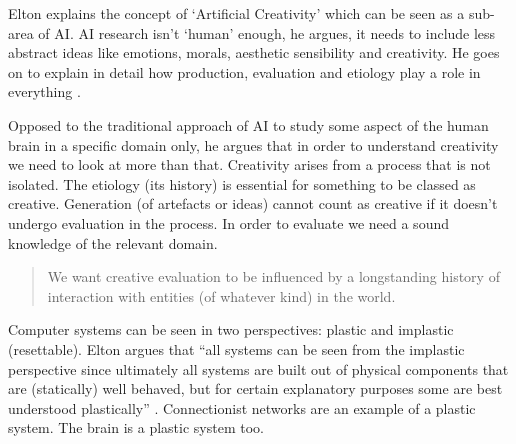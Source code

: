 \spirals

Elton explains the concept of `Artificial Creativity' which can be seen as a sub-area of \ac{AI}. \ac{AI} research isn't `human' enough, he argues, it needs to include less abstract ideas like emotions, morals, aesthetic sensibility and creativity. He goes on to explain in detail how production, evaluation and etiology play a role in everything \autocite{Elton1995}.

Opposed to the traditional approach of \ac{AI} to study some aspect of the human brain in a specific domain only, he argues that in order to understand creativity we need to look at more than that. Creativity arises from a process that is not isolated. The etiology (its history) is essential for something to be classed as creative. Generation (of artefacts or ideas) cannot count as creative if it doesn't undergo evaluation in the process. In order to evaluate we need a sound knowledge of the relevant domain. 

\begin{quotation}
  We want creative evaluation to be influenced by a longstanding history of interaction with entities (of whatever kind) in the world. 
\end{quotation}
  
Computer systems can be seen in two perspectives: plastic and implastic (resettable). Elton argues that ``all systems can be seen from the implastic perspective since ultimately all systems are built out of physical components that are (statically) well behaved, but for certain explanatory purposes some are best understood plastically'' \citeyear{Elton1995}. Connectionist networks are an example of a plastic system. The brain is a plastic system too.



